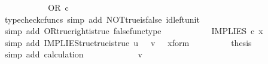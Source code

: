 \begin{isabellebody}
\ \ \ \ \ \ \isamarkupfalse%
\ \isamarkupfalse%
\ {\isachardoublequoteopen}{\isachardot}{\kern0pt}{\isachardot}{\kern0pt}{\isachardot}{\kern0pt}\ {\isacharequal}{\kern0pt}\ OR\ {\isasymcirc}\isactrlsub c\ {\isasymlangle}{\isasymf}{\isacharcomma}{\kern0pt}\ {\isasymt}{\isasymrangle}{\isachardoublequoteclose}\isanewline
\ \ \ \ \ \ \ \ \isamarkupfalse%
\ {\isacharparenleft}{\kern0pt}typecheck{\isacharunderscore}{\kern0pt}cfuncs{\isacharcomma}{\kern0pt}\ simp\ add{\isacharcolon}{\kern0pt}\ NOT{\isacharunderscore}{\kern0pt}true{\isacharunderscore}{\kern0pt}is{\isacharunderscore}{\kern0pt}false\ id{\isacharunderscore}{\kern0pt}left{\isacharunderscore}{\kern0pt}unit{}{\isacharparenright}{\kern0pt}\isanewline
\ \ \ \ \ \ \isamarkupfalse%
\ \isamarkupfalse%
\ {\isachardoublequoteopen}{\isachardot}{\kern0pt}{\isachardot}{\kern0pt}{\isachardot}{\kern0pt}\ {\isacharequal}{\kern0pt}\ {\isasymt}{\isachardoublequoteclose}\isanewline
\ \ \ \ \ \ \ \ \isamarkupfalse%
\ {\isacharparenleft}{\kern0pt}simp\ add{\isacharcolon}{\kern0pt}\ OR{\isacharunderscore}{\kern0pt}true{\isacharunderscore}{\kern0pt}right{\isacharunderscore}{\kern0pt}is{\isacharunderscore}{\kern0pt}true\ false{\isacharunderscore}{\kern0pt}func{\isacharunderscore}{\kern0pt}type{\isacharparenright}{\kern0pt}\isanewline
\ \ \ \ \ \ \isamarkupfalse%
\ \isamarkupfalse%
\ {\isachardoublequoteopen}{\isachardot}{\kern0pt}{\isachardot}{\kern0pt}{\isachardot}{\kern0pt}\ {\isacharequal}{\kern0pt}\ IMPLIES\ {\isasymcirc}\isactrlsub c\ x{\isachardoublequoteclose}\isanewline
\ \ \ \ \ \ \ \ \isamarkupfalse%
\ {\isacharparenleft}{\kern0pt}simp\ add{\isacharcolon}{\kern0pt}\ IMPLIES{\isacharunderscore}{\kern0pt}true{\isacharunderscore}{\kern0pt}true{\isacharunderscore}{\kern0pt}is{\isacharunderscore}{\kern0pt}true\ {\isacartoucheopen}u\ {\isacharequal}{\kern0pt}\ {\isasymt}{\isacartoucheclose}\ {\isacartoucheopen}v\ {\isacharequal}{\kern0pt}\ {\isasymt}{\isacartoucheclose}\ x{\isacharunderscore}{\kern0pt}form{\isacharparenright}{\kern0pt}\isanewline
\ \ \ \ \ \ \isamarkupfalse%
\ \isamarkupfalse%
\ {\isacharquery}{\kern0pt}thesis\isanewline
\ \ \ \ \ \ \ \ \isamarkupfalse%
\ {\isacharparenleft}{\kern0pt}simp\ add{\isacharcolon}{\kern0pt}\ calculation{\isacharparenright}{\kern0pt}\isanewline
\ \ \ \ \isamarkupfalse%
\isanewline
\ \ \ \ \ \ \isamarkupfalse%
\ {\isachardoublequoteopen}v\ {\isasymnoteq}\ {\isasymt}{\isachardoublequoteclose}\isanewline

\end{isabellebody}
